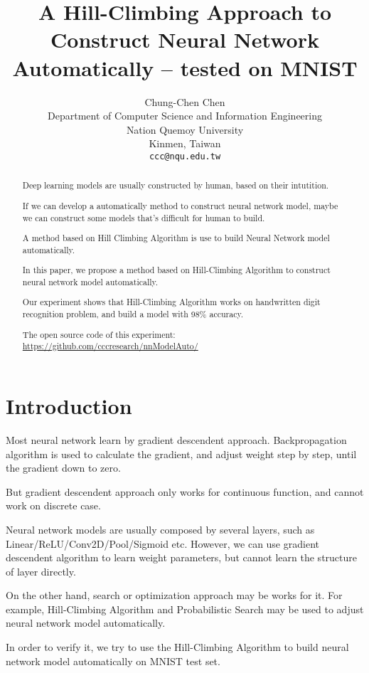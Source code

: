 \documentclass{article}
\title{A Hill-Climbing Approach to Construct Neural Network Automatically -- tested on MNIST}
\author{
  Chung-Chen Chen \\
  Department of Computer Science and Information Engineering\\
  Nation Quemoy University\\
  Kinmen, Taiwan \\
  \texttt{ccc@nqu.edu.tw} \\
}
\begin{document}
\maketitle

\begin{abstract}
Deep learning models are usually constructed by human, based on their intutition.

If we can develop a automatically method to construct neural network model, maybe we can construct some models that's difficult for human to build. 

A method based on Hill Climbing Algorithm is use to build Neural Network model automatically. 

In this paper, we propose a method based on Hill-Climbing Algorithm to construct neural network model automatically.

Our experiment shows that Hill-Climbing Algorithm works on handwritten digit recognition problem, and build a model with 98\% accuracy.

The open source code of this experiment: \url{ https://github.com/cccresearch/nnModelAuto/ }

\end{abstract}




\section{Introduction}
Most neural network learn by gradient descendent approach. Backpropagation algorithm is used to calculate the gradient, and adjust weight step by step, until the gradient down to zero. 

But gradient descendent approach only works for continuous function, and cannot work on discrete case.

Neural network models are usually composed by several layers, such as Linear/ReLU/Conv2D/Pool/Sigmoid etc. However, we can use gradient descendent algorithm to learn weight parameters, but cannot learn the structure of layer directly.

On the other hand, search or optimization approach may be works for it. For example, Hill-Climbing Algorithm and Probabilistic Search may be used to adjust neural network model automatically.

In order to verify it, we try to use the Hill-Climbing Algorithm to build neural network model automatically on MNIST test set.
\end{document}
